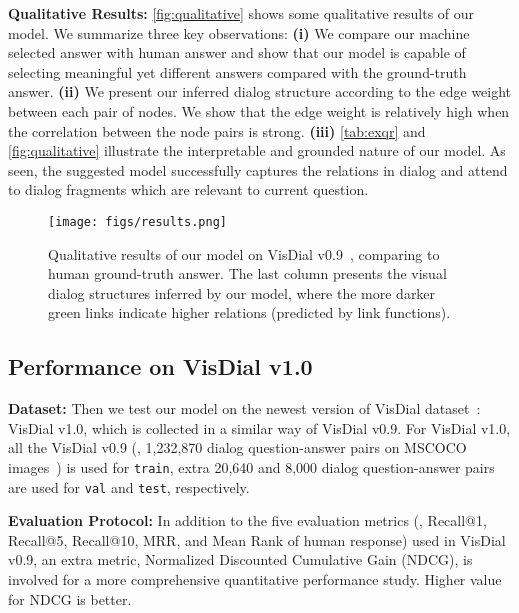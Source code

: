 \documentclass[10pt,twocolumn,letterpaper]{article}
\begin{document}
\noindent\textbf{Qualitative Results:} \autoref{fig:qualitative} shows some qualitative results of our model. We summarize three key observations: \textbf{(i)} We compare our machine selected answer with human answer and show that our model is capable of selecting meaningful yet different answers compared with the ground-truth answer.
\textbf{(ii)} We present our inferred dialog structure according to the edge weight between each pair of nodes. We show that the edge weight is relatively high when the correlation between the node pairs is strong.
\textbf{(iii)} \autoref{tab:exqr} and \autoref{fig:qualitative}
illustrate the interpretable and grounded nature of our model. As seen, the suggested model successfully captures the relations in dialog and attend to dialog fragments which are relevant to current question.

\begin{figure*}[ht]
\centering
      \texttt{[image: figs/results.png]}
\caption{\small Qualitative results of our model on VisDial v0.9~\cite{das2017visual}, comparing to human ground-truth answer. The last column presents the visual dialog structures inferred by our model, where the more darker green links indicate higher relations (predicted by link functions). }
\label{fig:qualitative}
\vspace{-12pt}
\end{figure*}

\vspace{-3pt}
\subsection{Performance on VisDial v1.0~\cite{das2017visual}}\label{sec:vdv1}
\vspace{-1pt}
\noindent\textbf{Dataset:} Then we test our model on the newest version of VisDial dataset~\cite{das2017visual}: VisDial v1.0, which is collected in a similar way of VisDial v0.9. For VisDial v1.0, all the VisDial v0.9 (\ie, 1,232,870 dialog question-answer pairs on MSCOCO images~\cite{lin2014microsoft}) is used for \verb"train", extra 20,640 and 8,000 dialog question-answer pairs are used for \verb"val" and \verb"test", respectively.

\noindent\textbf{Evaluation Protocol:} In addition to the five evaluation metrics (\ie, Recall@1, Recall@5, Recall@10, MRR, and Mean Rank of human response) used in VisDial v0.9, an extra metric, Normalized Discounted Cumulative Gain (NDCG), is involved for a more comprehensive quantitative performance study. Higher value for NDCG is better.
\end{document}
